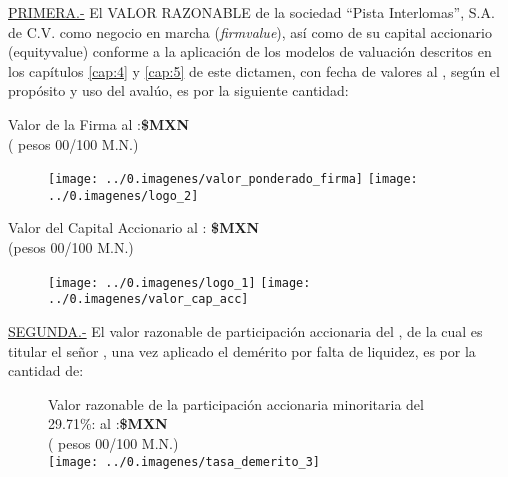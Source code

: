 \textcolor{principal}{\underline{PRIMERA.-}} El \textcolor{principal}{VALOR RAZONABLE} de la sociedad \textcolor{principal}{``Pista Interlomas'', S.A. de C.V.} como negocio en marcha (\textit{\gls{firmvalue}}), as\'i como de su capital accionario (\gls{equityvalue}) conforme a la aplicaci\'on de los modelos de valuaci\'on descritos en los cap\'itulos \ref{cap:4} y \ref{cap:5}  de este dictamen, con fecha de valores al \fechaValores, seg\'un el prop\'osito y uso del aval\'uo, es por la siguiente cantidad:\\
\begin{center}
\textcolor{principal}{Valor de la Firma al \fechaValoresCorto:}\textbf{\$\valorFirma MXN}\\

(\textcolor{secundario}{\valorFirmaLetra{} pesos 00/100 M.N.})

\begin{figure}[H]
\centering
\texttt{[image: ../0.imagenes/valor\_ponderado\_firma]}\hspace{.5cm} \texttt{[image: ../0.imagenes/logo\_2]}\\
\end{figure}


\textcolor{principal}{Valor del Capital Accionario al \fechaValoresCorto:} \textbf{\$\valorCapital MXN}\\
(\textcolor{secundario}{\valorCapitalLetra pesos 00/100 M.N.})\\
\end{center}

\begin{figure}[H]
\centering
\texttt{[image: ../0.imagenes/logo\_1]}\hspace{2.1cm} \texttt{[image: ../0.imagenes/valor\_cap\_acc]}

\end{figure}
\espacio{.5cm}

\textcolor{principal}{\underline{SEGUNDA.-}} El valor razonable de participaci\'on accionaria del \capitalAccionario, de la cual es titular el se\~nor \nombrePropietario, una vez aplicado el dem\'erito por falta de liquidez, es por la cantidad de:

\begin{figure}[H]
\centering
\textcolor{principal}{Valor razonable de la participación accionaria minoritaria del 29.71\%:  al \fechaValoresCorto:}\textbf{\$\valorIliquidez MXN}\\

(\textcolor{secundario}{\valorIliquidezLetra{} pesos 00/100 M.N.})\\


\texttt{[image: ../0.imagenes/tasa\_demerito\_3]}

\end{figure} 


\vspace{2cm}